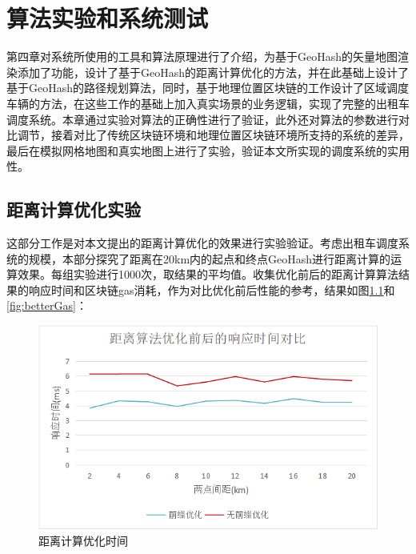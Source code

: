\chapter{算法实验和系统测试}
第四章对系统所使用的工具和算法原理进行了介绍，为基于GeoHash的矢量地图渲染添加了功能，设计了基于GeoHash的距离计算优化的方法，并在此基础上设计了基于GeoHash的路径规划算法，同时，基于地理位置区块链的工作设计了区域调度车辆的方法，在这些工作的基础上加入真实场景的业务逻辑，实现了完整的出租车调度系统。本章通过实验对算法的正确性进行了验证，此外还对算法的参数进行对比调节，接着对比了传统区块链环境和地理位置区块链环境所支持的系统的差异，最后在模拟网格地图和真实地图上进行了实验，验证本文所实现的调度系统的实用性。

\section{距离计算优化实验}
这部分工作是对本文提出的距离计算优化的效果进行实验验证。考虑出租车调度系统的规模，本部分探究了距离在20km内的起点和终点GeoHash进行距离计算的运算效果。每组实验进行1000次，取结果的平均值。收集优化前后的距离计算算法结果的响应时间和区块链gas消耗，作为对比优化前后性能的参考，结果如图\ref{fig:betterDistance}和\ref{fig:betterGas}：

\begin{figure}
  \centering
  \includegraphics[width=1.0\textwidth]{figures/距离计算优化时间}
  \caption{距离计算优化时间}\label{fig:betterDistance}
\end{figure}

